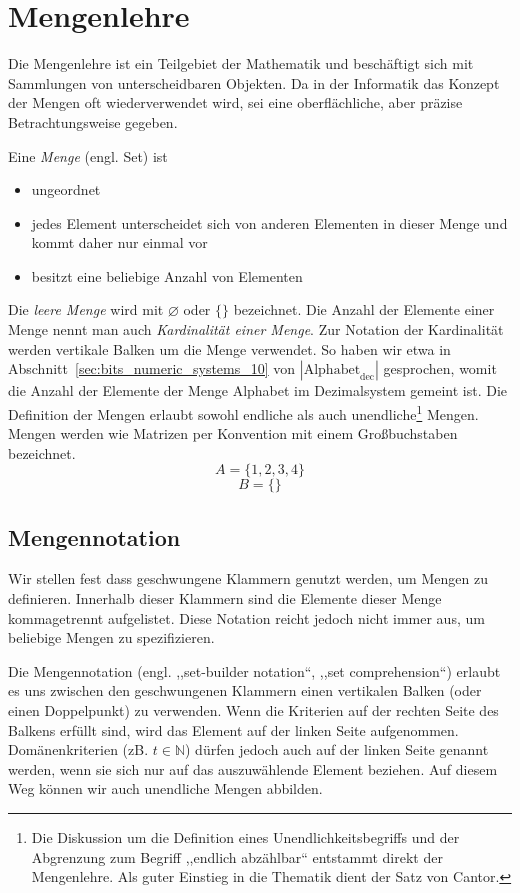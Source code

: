 \chapter{Mengenlehre}
%
Die Mengenlehre ist ein Teilgebiet der Mathematik und beschäftigt sich mit Sammlungen von unterscheidbaren Objekten. Da in der Informatik das Konzept der Mengen oft wiederverwendet wird, sei eine oberflächliche, aber präzise Betrachtungsweise gegeben.

Eine \emph{Menge} (engl. Set) ist
\begin{itemize}
 \item ungeordnet
 \item jedes Element unterscheidet sich von anderen Elementen in dieser Menge und kommt daher nur einmal vor
 \item besitzt eine beliebige Anzahl von Elementen
\end{itemize}
%
Die \emph{leere Menge} wird mit $\diameter$ oder $\{\}$ bezeichnet. Die Anzahl der Elemente einer Menge nennt man auch \emph{Kardinalität einer Menge}. Zur Notation der Kardinalität werden vertikale Balken um die Menge verwendet. So haben wir etwa in Abschnitt~\ref{sec:bits_numeric_systems_10} von $|\text{Alphabet}_{\text{dec}}|$ gesprochen, womit die Anzahl der Elemente der Menge Alphabet im Dezimalsystem gemeint ist. Die Definition der Mengen erlaubt sowohl endliche als auch unendliche\footnote{Die Diskussion um die Definition eines Unendlichkeitsbegriffs und der Abgrenzung zum Begriff ,,endlich abzählbar`` entstammt direkt der Mengenlehre. Als guter Einstieg in die Thematik dient der Satz von Cantor.} Mengen. Mengen werden wie Matrizen per Konvention mit einem Großbuchstaben bezeichnet.
%
\[
   A = \{1, 2, 3, 4\}
\] \[
   B = \{\}
\]

\section{Mengennotation}
%
Wir stellen fest dass geschwungene Klammern genutzt werden, um Mengen zu definieren. Innerhalb dieser Klammern sind die Elemente dieser Menge kommagetrennt aufgelistet. Diese Notation reicht jedoch nicht immer aus, um beliebige Mengen zu spezifizieren.

Die Mengennotation (engl. ,,set-builder notation``, ,,set comprehension``) erlaubt es uns zwischen den geschwungenen Klammern einen vertikalen Balken (oder einen Doppelpunkt) zu verwenden. Wenn die Kriterien auf der rechten Seite des Balkens erfüllt sind, wird das Element auf der linken Seite aufgenommen. Domänenkriterien (zB. $t \in \mathbb{N}$) dürfen jedoch auch auf der linken Seite genannt werden, wenn sie sich nur auf das auszuwählende Element beziehen. Auf diesem Weg können wir auch unendliche Mengen abbilden.

